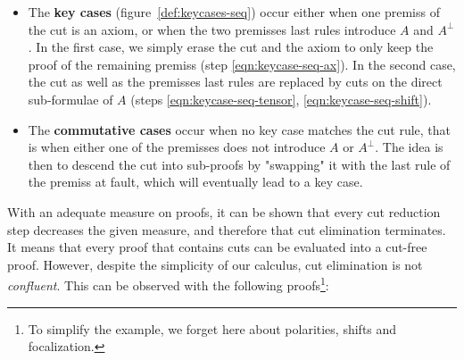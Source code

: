\documentclass[12pt]{report}
\begin{document}
\begin{itemize}
    \item The \textbf{key cases} (figure~\ref{def:keycases-seq}) occur either when one premiss of
        the cut is an axiom, or when the two premisses last rules introduce $A$ and $A^\bot$. In the
        first case, we simply erase the cut and the axiom to only keep the proof of the remaining
        premiss (step \ref{eqn:keycase-seq-ax}). In the second case, the cut as well as the
        premisses last rules are replaced by cuts on the direct sub-formulae of $A$ (steps
        \ref{eqn:keycase-seq-tensor}, \ref{eqn:keycase-seq-shift}).
    \item The \textbf{commutative cases} occur when no key case
        matches the cut rule, that is when either one of the premisses does not introduce $A$ or
        $A^\bot$. The idea is then to descend the cut into sub-proofs by "swapping" it with the last
        rule of the premiss at fault, which will eventually lead to a key case.
        
\end{itemize}

With an adequate measure on proofs, it can be shown that every cut reduction step decreases the
given measure, and therefore that cut elimination terminates. It means that every proof that
contains cuts can be evaluated into a cut-free proof. However, despite the simplicity of our
calculus, cut elimination is not \emph{confluent}. This can be observed with the following
proofs\footnote{To simplify the example, we forget here about polarities, shifts and focalization.}:
\end{document}
